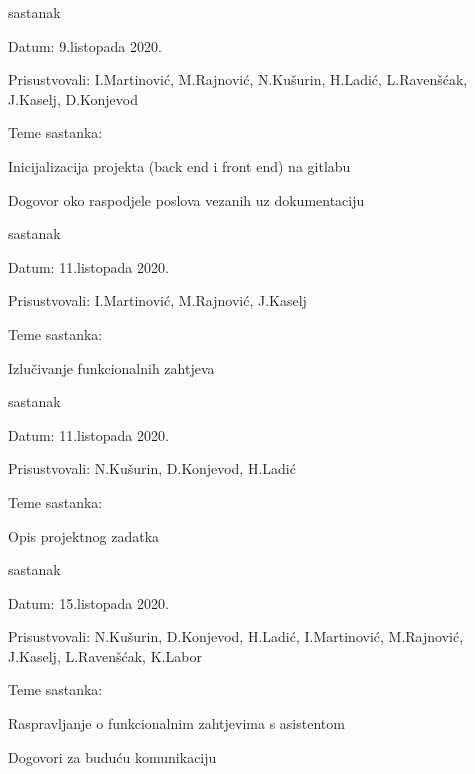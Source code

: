 \begin{packed_enum}
			\item  sastanak
			\item[] \begin{packed_item}
				\item Datum:  9.listopada 2020.
				\item Prisustvovali: I.Martinović, M.Rajnović, N.Kušurin, H.Ladić, L.Ravenšćak, J.Kaselj, D.Konjevod
				\item Teme sastanka:
				\begin{packed_item}
					\item   Inicijalizacija projekta (back end i front end) na gitlabu
					\item   Dogovor oko raspodjele poslova vezanih uz dokumentaciju
				\end{packed_item}
			\end{packed_item}
	
			\item sastanak
			\item[] \begin{packed_item}
				\item Datum: 11.listopada 2020.
				\item Prisustvovali: I.Martinović, M.Rajnović, J.Kaselj
				\item Teme sastanka:
				\begin{packed_item}
					\item   Izlučivanje funkcionalnih zahtjeva
				\end{packed_item}
			\end{packed_item}
		
			\item sastanak
			\item[] \begin{packed_item}
				\item Datum: 11.listopada 2020.
				\item Prisustvovali: N.Kušurin, D.Konjevod, H.Ladić
				\item Teme sastanka:
				\begin{packed_item}
					\item   Opis projektnog zadatka
				\end{packed_item}
			\end{packed_item}
		
		\item sastanak
		\item[] \begin{packed_item}
			\item Datum:  15.listopada 2020.
			\item Prisustvovali: N.Kušurin, D.Konjevod, H.Ladić, I.Martinović, M.Rajnović, J.Kaselj, L.Ravenšćak,  K.Labor
			\item Teme sastanka: 
			\begin{packed_item}
				\item   Raspravljanje o funkcionalnim zahtjevima s asistentom
				\item 	Dogovori za buduću komunikaciju
			\end{packed_item}
		\end{packed_item}
	

\end{packed_enum}
